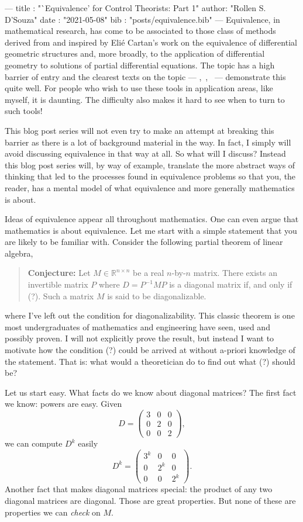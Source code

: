---
title :   "`Equivalence' for Control Theorists: Part 1"
author:   "Rollen S. D'Souza"
date  :   "2021-05-08"
bib   :   "posts/equivalence.bib"
---
Equivalence, in mathematical research, has come to be associated to those class of methods derived from and inspired by Eli\'e Cartan's work on the equivalence of differential geometric structures and, more broadly, to the application of differential geometry to solutions of partial differential equations.
The topic has a high barrier of entry and the clearest texts on the topic --- \cite{Bryant1999},~\cite{Olver1995},~\cite{Gardner1989} --- demonstrate this quite well.
For people who wish to use these tools in application areas, like myself, it is daunting.
The difficulty also makes it hard to see when to turn to such tools!

This blog post series will not even try to make an attempt at breaking this barrier as there is a lot of background material in the way.
In fact, I simply will avoid discussing equivalence in that way at all.
So what will I discuss?
Instead this blog post series will, by way of example, translate the more abstract ways of thinking that led to the processes found in equivalence problems so that you, the reader, has a mental model of what equivalence and more generally mathematics is about.

Ideas of equivalence appear all throughout mathematics.
One can even argue that mathematics is about equivalence.
Let me start with a simple statement that you are likely to be familiar with.
Consider the following partial theorem of linear algebra,
%
\begin{quote}
  \textbf{Conjecture:} Let \(M \in \mathbb{R}^{n\times n}\) be a real \(n\)-by-\(n\) matrix.
  There exists an invertible matrix \(P\) where \(D = P^{-1} M P\) is a diagonal matrix if, and only if (?).
  Such a matrix \(M\) is said to be diagonalizable.
\end{quote}
%
where I've left out the condition for diagonalizability.
This classic theorem is one most undergraduates of mathematics and engineering have seen, used and possibly proven.
I will not explicitly prove the result, but instead I want to motivate how the condition (?) could be arrived at without a-priori knowledge of the statement.
That is: what would a theoretician do to find out what (?) should be?

Let us start easy.
What facts do we know about diagonal matrices?
The first fact we know: powers are easy.
Given
\[
  D = \begin{pmatrix} 3 & 0 & 0 \\ 0 & 2 & 0 \\ 0 & 0 & 2 \end{pmatrix},
\]
we can compute \(D^k\) easily
\[
  D^k = \begin{pmatrix} 3^k & 0 & 0 \\ 0 & 2^k & 0 \\ 0 & 0 & 2^k \end{pmatrix}.
\]
Another fact that makes diagonal matrices special: the product of any two diagonal matrices are diagonal.
Those are great properties.
But none of these are properties we can \emph{check} on \(M.\)

